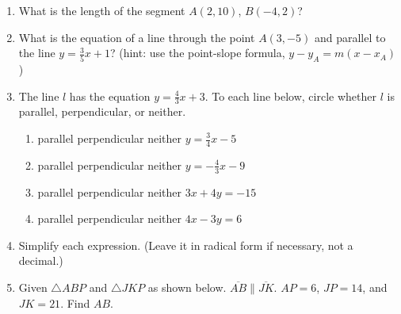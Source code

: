 \documentclass[12pt, twoside]{article}
\begin{document}
\begin{enumerate}
\newpage

  \item What is the length of the segment $A(2,10)$, $B(-4,2)$?
    \vspace{4cm}

  \item What is the equation of a line through the point $A(3,-5)$ and parallel to the line $y=\frac{3}{5}x+1$? (hint: use the point-slope formula, $y-y_A=m (x-x_A)$) \vspace{2.5cm}


  \item The line $l$ has the equation $y=\frac{4}{3}x+3$. To each line below, circle whether $l$ is parallel, perpendicular, or neither.
    \begin{enumerate}
      \item parallel \quad perpendicular \quad neither \qquad $y=\frac{3}{4}x-5$
      \vspace{0.5cm}
      \item parallel \quad perpendicular \quad neither \qquad $y=-\frac{4}{3}x-9$
      \vspace{0.5cm}
      \item parallel \quad perpendicular \quad neither \qquad $3x+4y=-15$
      \vspace{2cm}
      \item parallel \quad perpendicular \quad neither \qquad $4x-3y=6$
      \vspace{1.7cm}
    \end{enumerate}

  \item Simplify each expression. (Leave it in radical form if necessary, not a decimal.)
    \begin{enumerate}
    \end{enumerate}

\newpage

 \item Given $\triangle ABP$ and $\triangle JKP$ as shown below. $\overline{AB} \parallel \overline{JK}$. $AP=6$, $JP=14$, and $JK=21$. Find $AB$.
 \begin{center}
     \end{center}
 \vspace{2cm}



\end{enumerate}
\end{document}
